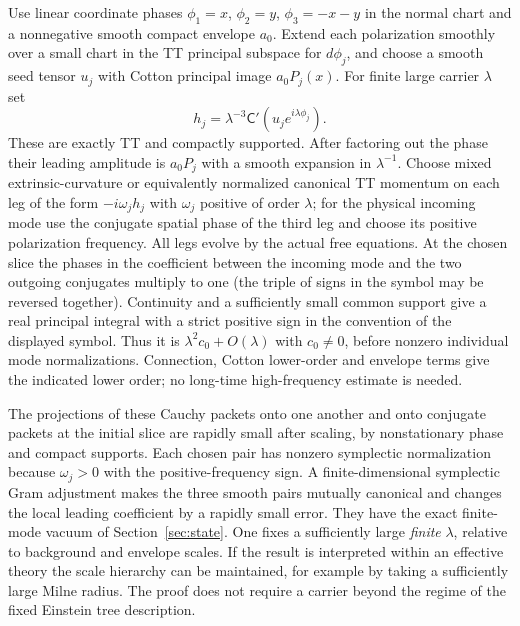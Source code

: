 Use linear coordinate phases \(\phi_1=x\), \(\phi_2=y\), \(\phi_3=-x-y\) in the normal chart and a nonnegative smooth compact envelope \(a_0\). Extend each polarization smoothly over a small chart in the TT principal subspace for \(d\phi_j\), and choose a smooth seed tensor \(u_j\) with Cotton principal image \(a_0P_j(x)\). For finite large carrier \(\lambda\) set
\begin{equation}
        h_j=\lambda^{-3}\mathsf C'(u_j e^{i\lambda\phi_j}) .
        \label{eq:cotton}
\end{equation}
These are exactly TT and compactly supported. After factoring out the phase their leading amplitude is \(a_0P_j\) with a smooth expansion in \(\lambda^{-1}\). Choose mixed extrinsic-curvature or equivalently normalized canonical TT momentum on each leg of the form \(-i\omega_jh_j\) with \(\omega_j\) positive of order \(\lambda\); for the physical incoming mode use the conjugate spatial phase of the third leg and choose its positive polarization frequency. All legs evolve by the actual free equations. At the chosen slice the phases in the coefficient between the incoming mode and the two outgoing conjugates multiply to one (the triple of signs in the symbol may be reversed together). Continuity and a sufficiently small common support give a real principal integral with a strict positive sign in the convention of the displayed symbol. Thus it is \(\lambda^2 c_0+O(\lambda)\) with \(c_0\ne0\), before nonzero individual mode normalizations. Connection, Cotton lower-order and envelope terms give the indicated lower order; no long-time high-frequency estimate is needed.

The projections of these Cauchy packets onto one another and onto conjugate packets at the initial slice are rapidly small after scaling, by nonstationary phase and compact supports. Each chosen pair has nonzero symplectic normalization because \(\omega_j>0\) with the positive-frequency sign. A finite-dimensional symplectic Gram adjustment makes the three smooth pairs mutually canonical and changes the local leading coefficient by a rapidly small error. They have the exact finite-mode vacuum of Section~\ref{sec:state}. One fixes a sufficiently large \emph{finite} \(\lambda\), relative to background and envelope scales. If the result is interpreted within an effective theory the scale hierarchy can be maintained, for example by taking a sufficiently large Milne radius. The proof does not require a carrier beyond the regime of the fixed Einstein tree description.

